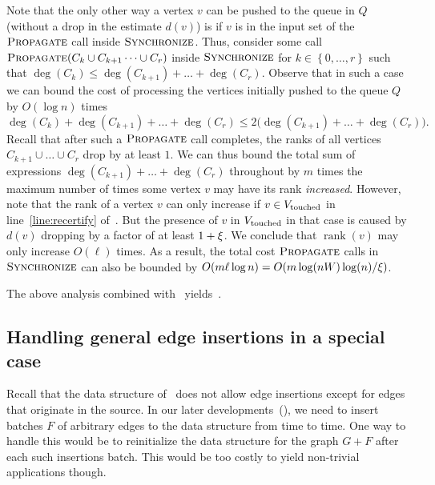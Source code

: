 \documentclass[11pt,letterpaper]{article}
\theoremstyle{plain}
\renewcommand{\O}{O}
\newcommand{\set}[1]{\left\lbrace #1 \right\rbrace}
\DeclareMathOperator*{\rank}{rank}
\DeclareMathOperator*{\PD}{\textsc{Propagate}}
\begin{document}
Note that the only other way a vertex $v$ can be pushed to the queue in $Q$ (without a drop in the estimate $d(v)$) is if $v$ is in the input set of the $\PD$ call inside $\textsc{Synchronize}$.
Thus, consider some call $\PD(C_k \cup C_{k + 1} \dots \cup C_{r})$ inside $\textsc{Synchronize}$ for $k \in \set{0, \dots, r}$ such that
  $\deg(C_k) \le \deg(C_{k + 1}) + \dots + \deg(C_r)$.
Observe that in such a case we can bound the cost of processing the vertices initially pushed to the queue $Q$ by $\O(\log{n})$ times
  \[ \deg(C_k) + \deg(C_{k + 1}) + \dots + \deg(C_r) \le 2 \big( \deg(C_{k + 1}) + \dots + \deg(C_r) \big).\]
Recall that after such a $\PD$ call completes, the ranks of all vertices
$C_{k+1}\cup\ldots\cup C_r$ drop by at least $1$. We can thus bound the
total sum of expressions $\deg(C_{k+1})+\ldots+\deg(C_r)$ throughout by $m$ times the maximum number of times some vertex $v$ may have its rank \emph{increased}.
However, note that the rank of a vertex $v$ can only increase if $v\in V_{\mathrm{touched}}$ in line~\ref{line:recertify} of~.
But the presence of $v$ in $V_{\mathrm{touched}}$ in that case is caused by $d(v)$ dropping by a factor of at least $1+\xi$.
We conclude that $\rank(v)$ may only increase $\O(\ell)$ times.
As a result, the total cost $\PD$ calls in $\textsc{Synchronize}$ can
also be bounded by $\O(m\ell\log{n})=\O(m\log(nW)\log(n)/\epsp)$.

The above analysis combined with~ yields~.
\subsection{Handling general edge insertions in a special case}\label{sec:reset}
Recall that the data structure of~ does not allow edge insertions except
for edges that originate in the source. 
In our later developments~(), we need to insert batches $F$ of arbitrary edges
to the data structure from time to time.
One way to handle this would be to reinitialize the data structure for the graph $G+F$ after each such insertions batch.
This would be too costly to yield non-trivial applications though.
\end{document}
